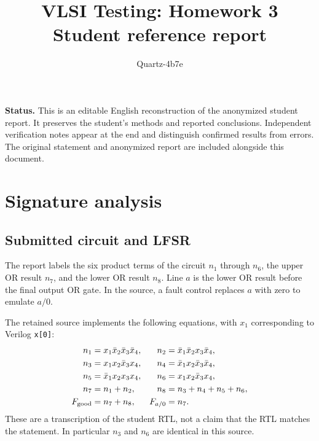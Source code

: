 \documentclass[11pt,a4paper]{article}
\title{VLSI Testing: Homework 3\\Student reference report}
\author{Quartz-4b7e}\date{}
\begin{document}
\maketitle
\textbf{Status.} This is an editable English reconstruction of the anonymized student report. It preserves the student's methods and reported conclusions. Independent verification notes appear at the end and distinguish confirmed results from errors. The original statement and anonymized report are included alongside this document.
\section{Signature analysis}
\subsection{Submitted circuit and LFSR}
The report labels the six product terms of the circuit $n_1$ through $n_6$, the upper OR result $n_7$, and the lower OR result $n_8$. Line $a$ is the lower OR result before the final output OR gate. In the source, a fault control replaces $a$ with zero to emulate $a/0$.

The retained source implements the following equations, with $x_1$ corresponding to Verilog \texttt{x[0]}:
\begin{align*}
n_1&=x_1\bar x_2\bar x_3\bar x_4,&n_2&=\bar x_1\bar x_2x_3\bar x_4,\\
n_3&=x_1x_2\bar x_3x_4,&n_4&=\bar x_1x_2\bar x_3\bar x_4,\\
n_5&=\bar x_1x_2x_3x_4,&n_6&=x_1x_2\bar x_3x_4,\\
n_7&=n_1+n_2,&n_8&=n_3+n_4+n_5+n_6,\\
F_{\rm good}&=n_7+n_8,&F_{a/0}&=n_7.
\end{align*}
These are a transcription of the student RTL, not a claim that the RTL matches the statement. In particular $n_3$ and $n_6$ are identical in this source.
\end{document}
